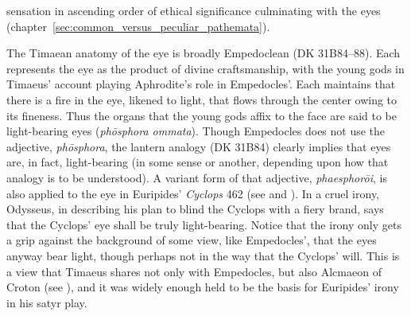 sensation in ascending order of ethical significance culminating with the eyes (chapter~\ref{sec:common_versus_peculiar_pathemata}).

The Timaean anatomy of the eye is broadly Empedoclean (DK 31B84--88). Each represents the eye as the product of divine craftsmanship, with the young gods in Timaeus' account playing Aphrodite's role in Empedocles'. Each maintains that there is a fire in the eye, likened to light, that flows through the center owing to its fineness. Thus the organs that the young gods affix to the face are said to be light-bearing eyes (\emph{phōsphora ommata}). Though Empedocles does not use the adjective, \emph{phōsphora}, the lantern analogy (DK 31B84) clearly implies that eyes are, in fact, light-bearing (in some sense or another, depending upon how that analogy is to be understood). A variant form of that adjective, \emph{phaesphorōi}, is also applied to the eye in Euripides' \emph{Cyclops} 462 (see \citealt[489-90]{Seaford:1984vb} and \citealt[114]{Johansen:2004dx}). In a cruel irony, Odysseus, in describing his plan to blind the Cyclops with a fiery brand, says that the Cyclops' eye shall be truly light-bearing. Notice that the irony only gets a grip against the background of some view, like Empedocles', that the eyes anyway bear light, though perhaps not in the way that the Cyclops' will. This is a view that Timaeus shares not only with Empedocles, but also Alcmaeon of Croton (see \citealt[11--13]{Beare:1906uq}), and it was widely enough held to be the basis for Euripides' irony in his satyr play.


